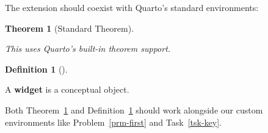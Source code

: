\documentclass[
]{article}
\newtheorem*{use case}{Use Case}
\theoremstyle{definition}
\newtheorem{definition}{Definition}[section]
\theoremstyle{plain}
\newtheorem{theorem}{Theorem}[section]
\theoremstyle{remark}
\begin{document}
The extension should coexist with Quarto's standard environments:

\begin{theorem}[Standard
Theorem]\protect\hypertarget{thm-standard}{}\label{thm-standard}

This uses Quarto's built-in theorem support.

\end{theorem}

\begin{definition}[]\protect\hypertarget{def-standard}{}\label{def-standard}

A \textbf{widget} is a conceptual object.

\end{definition}

Both Theorem~\ref{thm-standard} and Definition~\ref{def-standard} should
work alongside our custom environments like Problem~\ref{prm-first} and
Task~\ref{tsk-key}.
\end{document}
